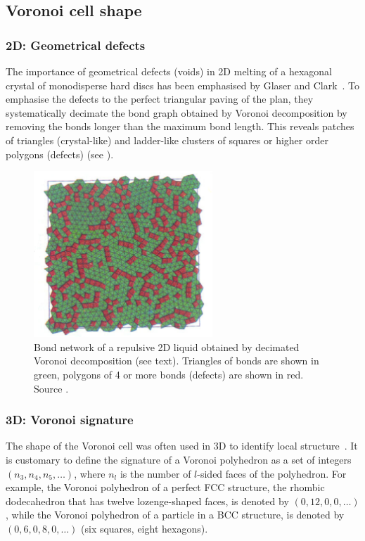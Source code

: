 \subsection{Voronoi cell shape}

\subsubsection{2D: Geometrical defects}

The importance of geometrical defects (voids) in 2D melting of a hexagonal crystal of monodisperse hard discs has been emphasised by Glaser and Clark~\citep{Glaser1990}. To emphasise the defects to the perfect triangular paving of the plan, they systematically decimate the bond graph obtained by Voronoi decomposition by removing the bonds longer than the maximum bond length. This reveals patches of triangles (crystal-like) and ladder-like clusters of squares or higher order polygons (defects) (see ).

\begin{figure}
	\centering
	\includegraphics[width=0.6\textwidth]{defects}
	\caption{Bond network of a repulsive 2D liquid obtained by decimated Voronoi decomposition (see text). Triangles of bonds are shown in green, polygons of 4 or more bonds (defects) are shown in red. Source .}
	\label{fig:defects}
\end{figure}

\subsubsection{3D: Voronoi signature}

The shape of the Voronoi cell was often used in 3D to identify local structure~\citep{Duijneveldt1992, Cape1981, Hsu1979a, Nose1986, tanemura1977geometrical}. It is customary to define the signature of a Voronoi polyhedron as a set of integers $(n_3 ,n_4 ,n_5 ,\ldots)$, where $n_l$ is the number of $l$-sided faces of the polyhedron. For example, the Voronoi polyhedron of a perfect \ac{FCC} structure, the rhombic dodecahedron that has twelve lozenge-shaped faces, is denoted by $(0, 12, 0, 0, \ldots)$, while the Voronoi polyhedron of a particle in a \ac{BCC} structure, is denoted by $(0, 6, 0, 8, 0, \ldots)$ (six squares, eight hexagons).

